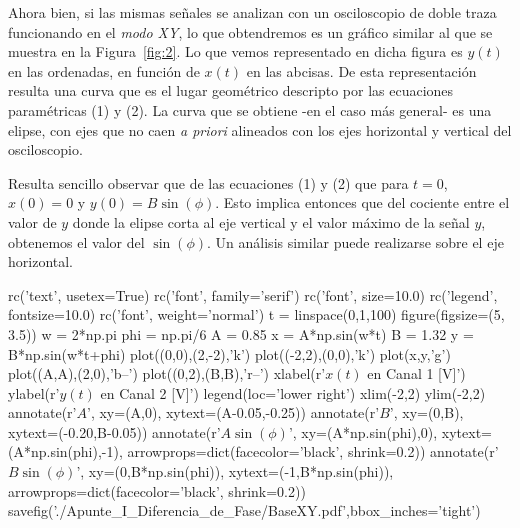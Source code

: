 \documentclass[laboratorio]{guia}
\begin{document}
Ahora bien, si las mismas se\~nales se analizan con un osciloscopio de doble
traza funcionando en el {\it modo XY}, lo que obtendremos es un gr\'afico
similar al que se muestra en la Figura~\ref{fig:2}. Lo que vemos representado
en dicha figura es $y(t)$ en las ordenadas, en funci\'on de $x(t)$ en las
abcisas. De esta representaci\'on resulta una curva que es el lugar
geom\'etrico descripto por las ecuaciones param\'etricas (1) y (2). La curva
que se obtiene -en el caso m\'as general- es una elipse, con ejes que no caen
{\it a priori} alineados con los ejes horizontal y vertical del osciloscopio.

Resulta sencillo observar que de las ecuaciones (1) y (2) que para $t=0$, $x(0)
= 0$ y $y(0)=B \sin(\phi)$. Esto implica entonces que del cociente entre el
valor de $y$ donde la elipse corta al eje vertical y el valor m\'aximo de la
se\~nal $y$, obtenemos el valor del $\sin(\phi)$. Un an\'alisis similar puede
realizarse sobre el eje horizontal.

\begin{pylabcode}
rc('text', usetex=True)
rc('font', family='serif')
rc('font', size=10.0)
rc('legend', fontsize=10.0)
rc('font', weight='normal')
t = linspace(0,1,100)
figure(figsize=(5, 3.5))
w = 2*np.pi
phi = np.pi/6
A = 0.85
x = A*np.sin(w*t)
B = 1.32
y = B*np.sin(w*t+phi)
plot((0,0),(2,-2),'k')
plot((-2,2),(0,0),'k')
plot(x,y,'g')
plot((A,A),(2,0),'b--')
plot((0,2),(B,B),'r--')
xlabel(r'$x(t)$ en Canal 1 [V]')
ylabel(r'$y(t)$ en Canal 2 [V]')
legend(loc='lower right')
xlim(-2,2)
ylim(-2,2)
annotate(r'$A$', xy=(A,0), xytext=(A-0.05,-0.25)) 
annotate(r'$B$', xy=(0,B), xytext=(-0.20,B-0.05)) 
annotate(r'$A \sin(\phi)$', xy=(A*np.sin(phi),0), 
         xytext=(A*np.sin(phi),-1), 
         arrowprops=dict(facecolor='black', shrink=0.2))
annotate(r'$B \sin(\phi)$', xy=(0,B*np.sin(phi)), 
         xytext=(-1,B*np.sin(phi)), 
         arrowprops=dict(facecolor='black', shrink=0.2))
savefig('./Apunte_I_Diferencia_de_Fase/BaseXY.pdf',bbox_inches='tight')
\end{pylabcode}
\end{document}
